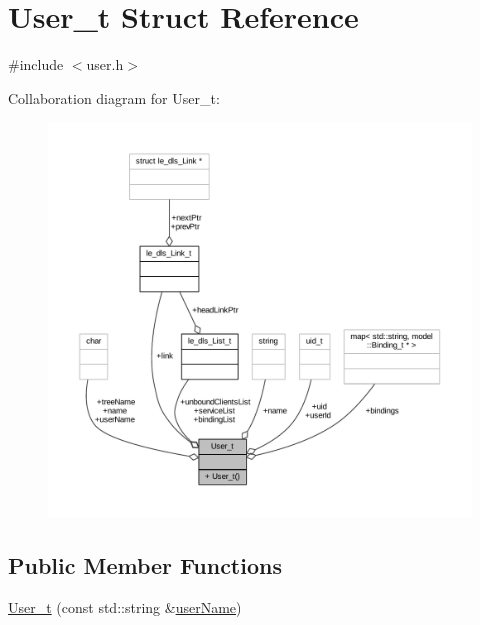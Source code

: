 \hypertarget{struct_user__t}{}\section{User\+\_\+t Struct Reference}
\label{struct_user__t}


{\ttfamily \#include $<$user.\+h$>$}



Collaboration diagram for User\+\_\+t\+:
\nopagebreak
\begin{figure}[H]
\begin{center}
\leavevmode
\includegraphics[width=350pt]{struct_user__t__coll__graph}
\end{center}
\end{figure}
\subsection*{Public Member Functions}
\begin{DoxyCompactItemize}
\item 
\hyperlink{struct_user__t_a15812482b2d6c8eec50e5d5528b495ee}{User\+\_\+t} (const std\+::string \&\hyperlink{struct_user__t_a979a46d6eb674114d1ac1b890d71b0fc}{user\+Name})
\end{DoxyCompactItemize}
